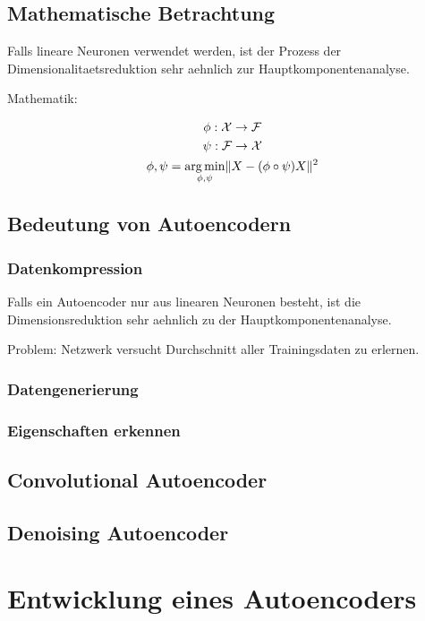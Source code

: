 \section{Mathematische Betrachtung}
Falls lineare Neuronen verwendet werden, ist der Prozess der
Dimensionalitaetsreduktion sehr aehnlich zur Hauptkomponentenanalyse.

Mathematik:


\begin{gather}
  \phi: \mathcal{X} \to \mathcal{F}\\
  \psi: \mathcal{F} \to \mathcal{X}\\
  \displaystyle\phi,\psi = \operatorname*{\arg \min}_{\phi,\psi} \lVert X - (\phi \circ \psi)X\rVert^2
\end{gather}

\section{Bedeutung von Autoencodern}
\subsection{Datenkompression}
Falls ein Autoencoder nur aus linearen Neuronen besteht, ist die
Dimensionsreduktion sehr aehnlich zu der Hauptkomponentenanalyse.

Problem: Netzwerk versucht Durchschnitt aller Trainingsdaten zu erlernen.
\subsection{Datengenerierung}
\subsection{Eigenschaften erkennen}

\section{Convolutional Autoencoder}

\section{Denoising Autoencoder}



\chapter{Entwicklung eines Autoencoders}

